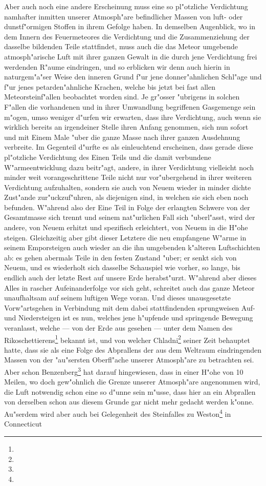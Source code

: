 \documentclass[a4paper, 8pt, oneside, polutonikogreek, german]{article}
\begin{document}
Aber auch noch eine andere Erscheinung muss eine so pl"otzliche Verdichtung namhafter inmitten unserer Atmosph"are befindlicher Massen von luft- oder dunstf"ormigen Stoffen in ihrem Gefolge haben. In demselben Augenblick, wo in dem Innern des Feuermeteores die Verdichtung und die Zusammenziehung der dasselbe bildenden Teile stattfindet, muss auch die das Meteor umgebende atmosph"arische Luft mit ihrer ganzen Gewalt in die durch jene Verdichtung frei werdenden R"aume eindringen, und so erblicken wir denn auch hierin in naturgem"a"ser Weise den inneren Grund f"ur jene donner"ahnlichen Schl"age und f"ur jenes petarden"ahnliche Krachen, welche bis jetzt bei fast allen Meteorsteinf"allen beobachtet worden sind. Je gr"osser "ubrigens in solchen F"allen die vorhandenen und in ihrer Umwandlung begriffenen Gasgemenge sein m"ogen, umso weniger d"urfen wir erwarten, dass ihre Verdichtung, auch wenn sie wirklich bereits an irgendeiner Stelle ihren Anfang genommen, sich nun sofort und mit Einem Male "uber die ganze Masse nach ihrer ganzen Ausdehnung verbreite. Im Gegenteil d"urfte es als einleuchtend erscheinen, dass gerade diese pl"otzliche Verdichtung des Einen Teils und die damit verbundene W"armeentwicklung dazu beitr"agt, andere, in ihrer Verdichtung vielleicht noch minder weit vorangeschrittene Teile nicht nur vor"ubergehend in ihrer weiteren Verdichtung aufzuhalten, sondern sie auch von Neuem wieder in minder dichte Zust"ande zur"uckzuf"uhren, als diejenigen sind, in welchen sie sich eben noch befunden. W"ahrend also der Eine Teil in Folge der erlangten Schwere von der Gesamtmasse sich trennt und seinem nat"urlichen Fall sich "uberl"asst, wird der andere, von Neuem erhitzt und spezifisch erleichtert, von Neuem in die H"ohe steigen. Gleichzeitig aber gibt dieser Letztere die neu empfangene W"arme in seinem Emporsteigen auch wieder an die ihn umgebenden k"alteren Luftschichten ab: es gehen abermals Teile in den festen Zustand "uber; er senkt sich von Neuem, und es wiederholt sich dasselbe Schauspiel wie vorher, so lange, bis endlich auch der letzte Rest auf unsere Erde herabst"urzt. W"ahrend aber dieses Alles in rascher Aufeinanderfolge vor sich geht, schreitet auch das ganze Meteor unaufhaltsam auf seinem luftigen Wege voran. Und dieses unausgesetzte Vorw"artsgehen in Verbindung mit dem dabei stattfindenden sprungweisen Auf- und Niedersteigen ist es nun, welches jene h"upfende und springende Bewegung veranlasst, welche --- von der Erde aus gesehen --- unter dem Namen des Rikoschettierens\footnote{} bekannt ist, und von welcher Chladni\footnote{} seiner Zeit behauptet hatte, dass sie als eine Folge des Abprallens der aus dem Weltraum eindringenden Massen von der "au"sersten Oberfl"ache unserer Atmosph"are zu betrachten sei. Aber schon Benzenberg\footnote{} hat darauf hingewiesen, dass in einer H"ohe von 10 Meilen, wo doch gew"ohnlich die Grenze unserer Atmosph"are angenommen wird, die Luft notwendig schon eine so d"unne sein m"usse, dass hier an ein Abprallen von derselben schon aus diesem Grunde gar nicht mehr gedacht werden k"onne. Au"serdem wird aber auch bei Gelegenheit des Steinfalles zu Weston\footnote{} in Connecticut 
\end{document}
